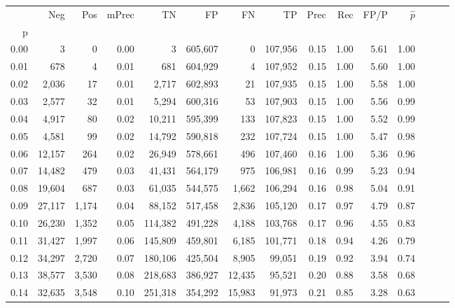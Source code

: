 \begin{tabular}{rrrrrrrrrrrrrrr}
\toprule
{} &     Neg &    Pos & mPrec &       TN &       FP &       FN &       TP &  Prec &   Rec &  FP/P & $\hat{p}$ \\
p    &         &        &       &          &          &          &          &       &       &       &           \\
\midrule
0.00 &       3 &      0 &  0.00 &        3 &  605,607 &        0 &  107,956 &  0.15 &  1.00 &  5.61 &      1.00 \\
0.01 &     678 &      4 &  0.01 &      681 &  604,929 &        4 &  107,952 &  0.15 &  1.00 &  5.60 &      1.00 \\
0.02 &   2,036 &     17 &  0.01 &    2,717 &  602,893 &       21 &  107,935 &  0.15 &  1.00 &  5.58 &      1.00 \\
0.03 &   2,577 &     32 &  0.01 &    5,294 &  600,316 &       53 &  107,903 &  0.15 &  1.00 &  5.56 &      0.99 \\
0.04 &   4,917 &     80 &  0.02 &   10,211 &  595,399 &      133 &  107,823 &  0.15 &  1.00 &  5.52 &      0.99 \\
0.05 &   4,581 &     99 &  0.02 &   14,792 &  590,818 &      232 &  107,724 &  0.15 &  1.00 &  5.47 &      0.98 \\
0.06 &  12,157 &    264 &  0.02 &   26,949 &  578,661 &      496 &  107,460 &  0.16 &  1.00 &  5.36 &      0.96 \\
0.07 &  14,482 &    479 &  0.03 &   41,431 &  564,179 &      975 &  106,981 &  0.16 &  0.99 &  5.23 &      0.94 \\
0.08 &  19,604 &    687 &  0.03 &   61,035 &  544,575 &    1,662 &  106,294 &  0.16 &  0.98 &  5.04 &      0.91 \\
0.09 &  27,117 &  1,174 &  0.04 &   88,152 &  517,458 &    2,836 &  105,120 &  0.17 &  0.97 &  4.79 &      0.87 \\
0.10 &  26,230 &  1,352 &  0.05 &  114,382 &  491,228 &    4,188 &  103,768 &  0.17 &  0.96 &  4.55 &      0.83 \\
0.11 &  31,427 &  1,997 &  0.06 &  145,809 &  459,801 &    6,185 &  101,771 &  0.18 &  0.94 &  4.26 &      0.79 \\
0.12 &  34,297 &  2,720 &  0.07 &  180,106 &  425,504 &    8,905 &   99,051 &  0.19 &  0.92 &  3.94 &      0.74 \\
0.13 &  38,577 &  3,530 &  0.08 &  218,683 &  386,927 &   12,435 &   95,521 &  0.20 &  0.88 &  3.58 &      0.68 \\
0.14 &  32,635 &  3,548 &  0.10 &  251,318 &  354,292 &   15,983 &   91,973 &  0.21 &  0.85 &  3.28 &      0.63 \\

\end{tabular}
